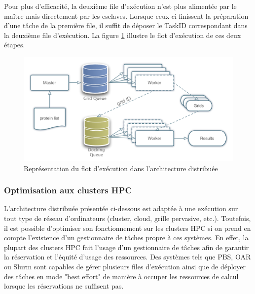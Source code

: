 Pour plus d'efficacité, la deuxième file d'exécution n'est plus alimentée par le maître mais directement par les esclaves. Lorsque ceux-ci finissent la préparation d'une tâche de la première file, il suffit de déposer le TaskID correspondant dans la deuxième file d'exécution. La figure \ref{fig:romain-fig3} illustre le flot d'exécution de ces deux étapes.  

\begin{figure}
	\begin{center}
		\includegraphics[width=0.85\linewidth]{images/Romain/fig3-color}
	\end{center}
	\caption{Représentation du flot d'exécution dans l'architecture distribuée}\label{fig:romain-fig3}
\end{figure}


\subsubsection{Optimisation aux clusters HPC}

 L'architecture distribuée présentée ci-dessous est adaptée à une exécution sur tout type de réseau d'ordinateurs (cluster, cloud, grille pervasive, etc.). Toutefois, il est possible d'optimiser son fonctionnement sur les clusters HPC si on prend en compte l'existence d'un gestionnaire de tâches propre à ces systèmes. En effet, la plupart des clusters HPC fait l'usage d'un gestionnaire de tâches afin de garantir la réservation et l'équité d'usage des ressources. Des systèmes tels que PBS, OAR ou Slurm sont capables de gérer plusieurs files d'exécution ainsi que de déployer des tâches en mode "best effort" de manière à occuper les ressources de calcul lorsque les réservations ne suffisent pas. 
 

